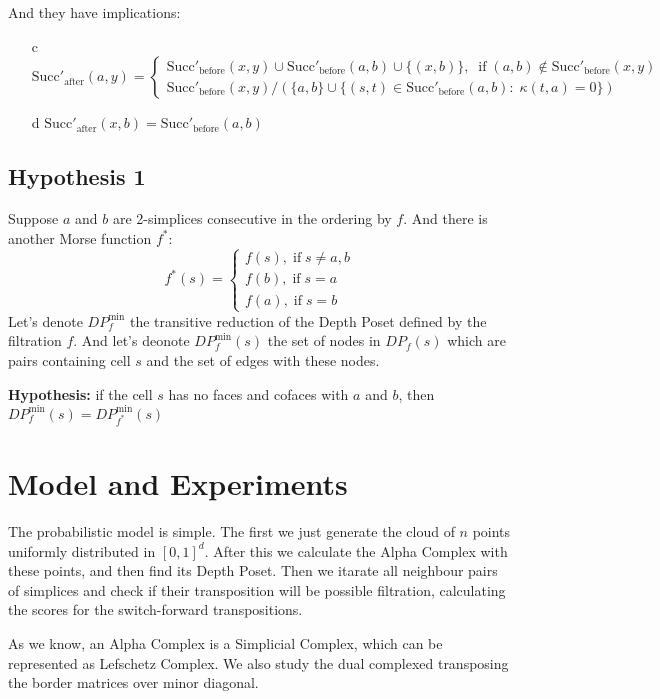\documentclass{article}
\begin{document}
And they have implications:

\begin{itemize}
\item[c] $
\text{Succ}'_\text{after}(a, y) =
\begin{cases}
\text{Succ}'_\text{before}(x, y) \cup \text{Succ}'_\text{before}(a, b) \cup \{(x, b)\}, \;\; \text{if}\; (a, b)\notin \text{Succ}'_\text{before}(x, y) \\
\text{Succ}'_\text{before}(x, y) / (\{a, b\} \cup \{(s, t)\in \text{Succ}'_\text{before}(a, b):\; \kappa(t, a) = 0\})
\end{cases}
$
\item[d] $\text{Succ}'_\text{after}(x, b) = \text{Succ}'_\text{before}(a, b)$
\end{itemize}


\subsection{Hypothesis 1}
\par Suppose $a$ and $b$ are 2-simplices consecutive in the ordering by $f$. And there is another Morse function $f^*$:
$$
f^*(s) =
\begin{cases}
f(s), \; \text{if} \; s\ne a, b \\
f(b), \; \text{if} \; s = a \\
f(a), \; \text{if} \; s = b
\end{cases}
$$
Let's denote $DP_{f}^\text{min}$ the transitive reduction of the Depth Poset defined by the filtration $f$. And let's deonote $DP_{f}^\text{min}(s)$ the set of nodes in $DP_f(s)$ which are pairs containing cell $s$ and the set of edges with these nodes.

\par \textbf{Hypothesis:} if the cell $s$ has no faces and cofaces with $a$ and $b$, then $DP_f^\text{min}(s) = DP_{f^*}^\text{min}(s)$


\section{Model and Experiments}

\par The probabilistic model is simple. The first we just generate the cloud of $n$ points uniformly distributed in $[0, 1]^d$. After this we calculate the Alpha Complex with these points, and then find its Depth Poset. Then we itarate all neighbour pairs of simplices and check if their transposition will be possible filtration, calculating the scores for the switch-forward transpositions.
\par As we know, an Alpha Complex is a Simplicial Complex, which can be represented as Lefschetz Complex. We also study the dual complexed transposing the border matrices over minor diagonal.
\end{document}
